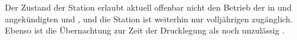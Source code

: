 \begin{newstuff}
    Der Zustand der Station erlaubt aktuell offenbar nicht den Betrieb der in \cite{ctour} und \cite{cbasestarbasemanual} angekündigten  und , und die Station ist weiterhin nur volljährigen zugänglich. Ebenso ist die Übernachtung zur Zeit der Drucklegung als  noch unzulässig \cite[S. 58]{cbasebook}.
\end{newstuff}
